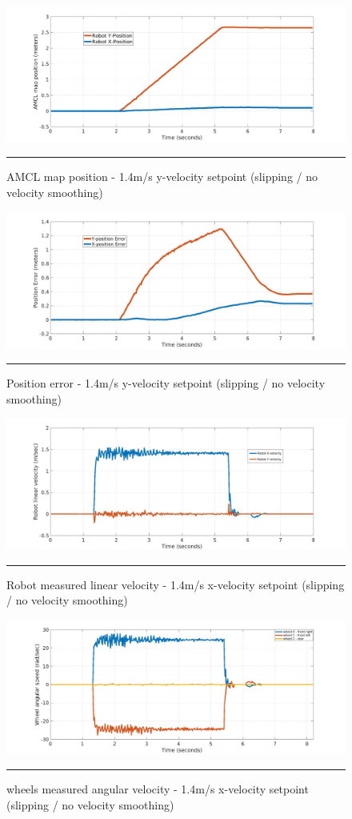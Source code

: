 \begin{figure}[H]
	\centering
	\includegraphics[width=12cm]{images/03-foundation/amcl14y}
	\rule{35em}{0.5pt}
	\caption{AMCL map position - 1.4m/s y-velocity setpoint (slipping / no velocity smoothing)} 
	\label{amcl14y}
\end{figure}

\begin{figure}[H]
	\centering
	\includegraphics[width=12cm]{images/03-foundation/poserror14y}
	\rule{35em}{0.5pt}
	\caption{Position error - 1.4m/s y-velocity setpoint (slipping / no velocity smoothing)} 
	\label{poserror14y}
\end{figure}

\begin{figure}[H]
	\centering
	\includegraphics[width=12cm]{images/03-foundation/vel14}
	\rule{35em}{0.5pt}
	\caption{Robot measured linear velocity - 1.4m/s x-velocity setpoint (slipping / no velocity smoothing)} 
	\label{vel14}
\end{figure}

\begin{figure}[H]
	\centering
	\includegraphics[width=12cm]{images/03-foundation/wheel14}
	\rule{35em}{0.5pt}
	\caption{wheels measured angular velocity - 1.4m/s x-velocity setpoint (slipping / no velocity smoothing)} 
	\label{wheel14}
\end{figure}

